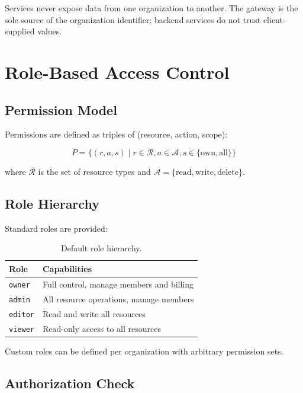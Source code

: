 \documentclass[11pt,a4paper]{article}
\begin{document}
Services never expose data from one organization to another. The gateway is the sole source of the organization identifier; backend services do not trust client-supplied values.

\section{Role-Based Access Control}

\subsection{Permission Model}

Permissions are defined as triples of (resource, action, scope):

\begin{equation}
    P = \{(r, a, s) \mid r \in \mathcal{R}, a \in \mathcal{A}, s \in \{\text{own}, \text{all}\}\}
\end{equation}

where $\mathcal{R}$ is the set of resource types and $\mathcal{A} = \{\text{read}, \text{write}, \text{delete}\}$.

\subsection{Role Hierarchy}

Standard roles are provided:

\begin{table}[h]
\centering
\caption{Default role hierarchy.}
\begin{tabular}{ll}
\toprule
\textbf{Role} & \textbf{Capabilities} \\
\midrule
\texttt{owner}   & Full control, manage members and billing \\
\texttt{admin}   & All resource operations, manage members \\
\texttt{editor}  & Read and write all resources \\
\texttt{viewer}  & Read-only access to all resources \\
\bottomrule
\end{tabular}
\end{table}

Custom roles can be defined per organization with arbitrary permission sets.

\subsection{Authorization Check}
\end{document}

